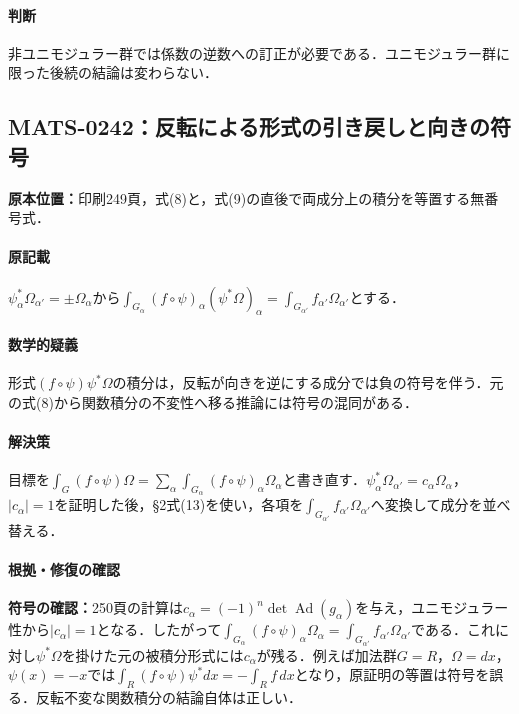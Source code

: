 \documentclass[a4paper,10pt]{ltjsarticle}
\begin{document}
\paragraph{判断}非ユニモジュラー群では係数の逆数への訂正が必要である．ユニモジュラー群に限った後続の結論は変わらない．


\subsection*{MATS-0242：反転による形式の引き戻しと向きの符号}\label{math:MATS-0242}
\noindent\textbf{原本位置：}印刷249頁，式(8)と，式(9)の直後で両成分上の積分を等置する無番号式．

\paragraph{原記載}$\psi_\alpha^*\Omega_{\alpha'}=\pm\Omega_\alpha$から$\int_{G_\alpha}(f\circ\psi)_\alpha(\psi^*\Omega)_\alpha=\int_{G_{\alpha'}}f_{\alpha'}\Omega_{\alpha'}$とする．

\paragraph{数学的疑義}形式$(f\circ\psi)\psi^*\Omega$の積分は，反転が向きを逆にする成分では負の符号を伴う．元の式(8)から関数積分の不変性へ移る推論には符号の混同がある．

\paragraph{解決策}目標を$\int_G(f\circ\psi)\Omega=\sum_\alpha\int_{G_\alpha}(f\circ\psi)_\alpha\Omega_\alpha$と書き直す．$\psi_\alpha^*\Omega_{\alpha\prime}=c_\alpha\Omega_\alpha$，$|c_\alpha|=1$を証明した後，§2式(13)を使い，各項を$\int_{G_{\alpha\prime}}f_{\alpha\prime}\Omega_{\alpha\prime}$へ変換して成分を並べ替える．

\paragraph{根拠・修復の確認}\textbf{符号の確認：}250頁の計算は$c_\alpha=(-1)^n\det\operatorname{Ad}(g_\alpha)$を与え，ユニモジュラー性から$|c_\alpha|=1$となる．したがって$\int_{G_\alpha}(f\circ\psi)_\alpha\Omega_\alpha=\int_{G_{\alpha\prime}}f_{\alpha\prime}\Omega_{\alpha\prime}$である．これに対し$\psi^*\Omega$を掛けた元の被積分形式には$c_\alpha$が残る．例えば加法群$G=R$，$\Omega=dx$，$\psi(x)=-x$では$\int_R(f\circ\psi)\psi^*dx=-\int_Rf\,dx$となり，原証明の等置は符号を誤る．反転不変な関数積分の結論自体は正しい．
\end{document}
